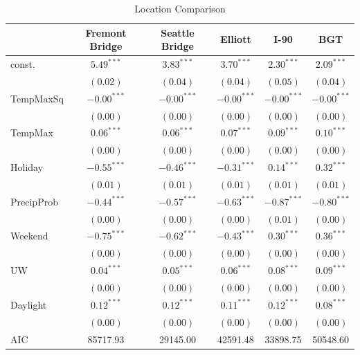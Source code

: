 \documentclass [11pt, proquest] {uwthesis}[2015/03/03]
\begin{document}
\begin{table}
\caption{Location Comparison}
\begin{center}
\begin{tabular}{l c c c c c }
\hline
 & Fremont Bridge & Seattle Bridge & Elliott & I-90 & BGT \\
\hline
const.         & $5.49^{***}$  & $3.83^{***}$  & $3.70^{***}$  & $2.30^{***}$  & $2.09^{***}$  \\
               & $(0.02)$      & $(0.04)$      & $(0.04)$      & $(0.05)$      & $(0.04)$      \\
TempMaxSq      & $-0.00^{***}$ & $-0.00^{***}$ & $-0.00^{***}$ & $-0.00^{***}$ & $-0.00^{***}$ \\
               & $(0.00)$      & $(0.00)$      & $(0.00)$      & $(0.00)$      & $(0.00)$      \\
TempMax        & $0.06^{***}$  & $0.06^{***}$  & $0.07^{***}$  & $0.09^{***}$  & $0.10^{***}$  \\
               & $(0.00)$      & $(0.00)$      & $(0.00)$      & $(0.00)$      & $(0.00)$      \\
Holiday        & $-0.55^{***}$ & $-0.46^{***}$ & $-0.31^{***}$ & $0.14^{***}$  & $0.32^{***}$  \\
               & $(0.01)$      & $(0.01)$      & $(0.01)$      & $(0.01)$      & $(0.01)$      \\
PrecipProb     & $-0.44^{***}$ & $-0.57^{***}$ & $-0.63^{***}$ & $-0.87^{***}$ & $-0.80^{***}$ \\
               & $(0.00)$      & $(0.00)$      & $(0.00)$      & $(0.01)$      & $(0.00)$      \\
Weekend        & $-0.75^{***}$ & $-0.62^{***}$ & $-0.43^{***}$ & $0.30^{***}$  & $0.36^{***}$  \\
               & $(0.00)$      & $(0.00)$      & $(0.00)$      & $(0.00)$      & $(0.00)$      \\
UW             & $0.04^{***}$  & $0.05^{***}$  & $0.06^{***}$  & $0.08^{***}$  & $0.09^{***}$  \\
               & $(0.00)$      & $(0.00)$      & $(0.00)$      & $(0.00)$      & $(0.00)$      \\
Daylight       & $0.12^{***}$  & $0.12^{***}$  & $0.11^{***}$  & $0.12^{***}$  & $0.08^{***}$  \\
               & $(0.00)$      & $(0.00)$      & $(0.00)$      & $(0.00)$      & $(0.00)$      \\
\hline
AIC            & 85717.93      & 29145.00      & 42591.48      & 33898.75      & 50548.60      \\

\end{tabular}
\end{center}
\end{table}
\end{document}
